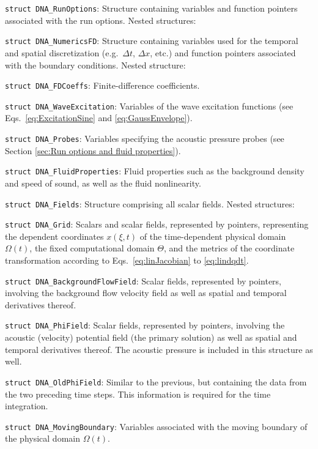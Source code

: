 \begin{compactitem}
\item {\tt struct DNA\_RunOptions}: Structure containing variables and function pointers associated with the run options. Nested structures:
\begin{compactitem}
\item {\tt struct DNA\_NumericsFD}: Structure containing variables used for the temporal and spatial discretization (e.g.~$\Delta t$, $\Delta x$, etc.) and function pointers associated with the boundary conditions. Nested structure: \item {\tt struct DNA\_FDCoeffs}: Finite-difference coefficients.
\item {\tt struct DNA\_WaveExcitation}: Variables of the wave excitation functions (see Eqs.~\eqref{eq:ExcitationSine} and \eqref{eq:GaussEnvelope}).
\item {\tt struct DNA\_Probes}: Variables specifying the acoustic pressure probes (see Section \ref{sec:Run options and fluid properties}).
\end{compactitem}
\item {\tt struct DNA\_FluidProperties}: Fluid properties such as the background density and speed of sound, as well as the fluid nonlinearity.
\item {\tt struct DNA\_Fields}: Structure comprising all scalar fields. Nested structures:
\begin{compactitem}
\item {\tt struct DNA\_Grid}: Scalars and scalar fields, represented by pointers, representing the dependent coordinates $x\left(\xi,t\right)$ of the time-dependent physical domain $\Omega\left(t\right)$, the fixed computational domain $\Theta$, and the metrics of the coordinate transformation according to Eqs.~\eqref{eq:linJacobian} to \eqref{eq:lindqdt}.
\item {\tt struct DNA\_BackgroundFlowField}: Scalar fields, represented by pointers, involving the background flow velocity field as well as spatial and temporal derivatives thereof.
\item {\tt struct DNA\_PhiField}: Scalar fields, represented by pointers, involving the acoustic (velocity) potential field (the primary solution) as well as spatial and temporal derivatives thereof. The acoustic pressure is included in this structure as well.
\item {\tt struct DNA\_OldPhiField}: Similar to the previous, but containing the data from the two preceding time steps. This information is required for the time integration.
\end{compactitem}
\item {\tt struct DNA\_MovingBoundary}: Variables associated with the moving boundary of the physical domain $\Omega\left(t\right)$.
\end{compactitem}



